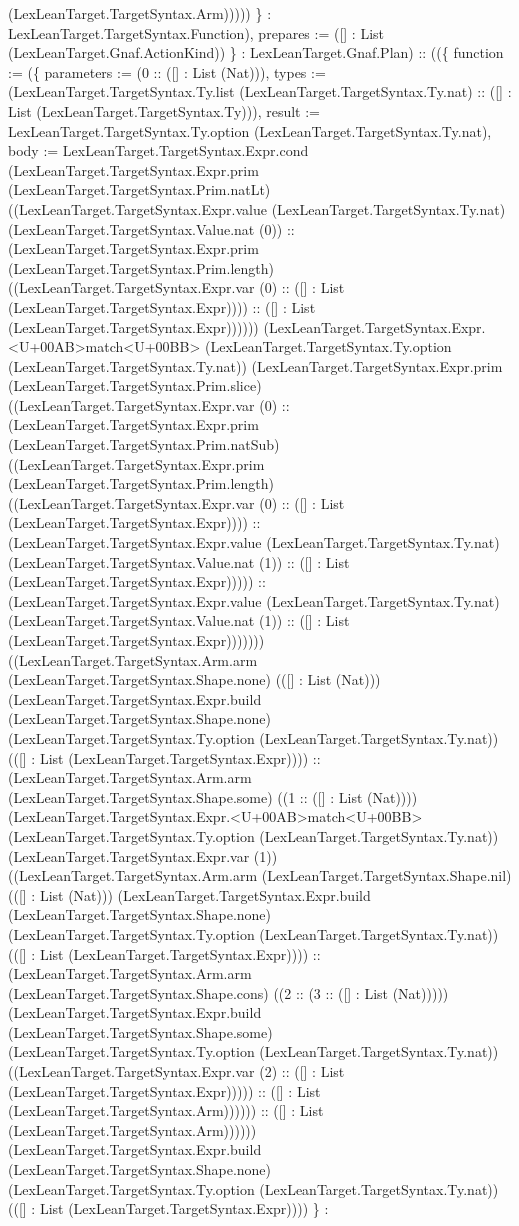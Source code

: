 \documentclass[11pt]{article}
\begin{document}
(LexLeanTarget.TargetSyntax.Arm))))) \} : LexLeanTarget.TargetSyntax.Function), prepares := ([] : List (LexLeanTarget.Gnaf.ActionKind)) \} : LexLeanTarget.Gnaf.Plan) :: ((\{ function := (\{ parameters := (0 :: ([] : List (Nat))), types := (LexLeanTarget.TargetSyntax.Ty.list (LexLeanTarget.TargetSyntax.Ty.nat) :: ([] : List (LexLeanTarget.TargetSyntax.Ty))), result := LexLeanTarget.TargetSyntax.Ty.option (LexLeanTarget.TargetSyntax.Ty.nat), body := LexLeanTarget.TargetSyntax.Expr.cond (LexLeanTarget.TargetSyntax.Expr.prim (LexLeanTarget.TargetSyntax.Prim.natLt) ((LexLeanTarget.TargetSyntax.Expr.value (LexLeanTarget.TargetSyntax.Ty.nat) (LexLeanTarget.TargetSyntax.Value.nat (0)) :: (LexLeanTarget.TargetSyntax.Expr.prim (LexLeanTarget.TargetSyntax.Prim.length) ((LexLeanTarget.TargetSyntax.Expr.var (0) :: ([] : List (LexLeanTarget.TargetSyntax.Expr)))) :: ([] : List (LexLeanTarget.TargetSyntax.Expr)))))) (LexLeanTarget.TargetSyntax.Expr.<U+00AB>match<U+00BB> (LexLeanTarget.TargetSyntax.Ty.option (LexLeanTarget.TargetSyntax.Ty.nat)) (LexLeanTarget.TargetSyntax.Expr.prim (LexLeanTarget.TargetSyntax.Prim.slice) ((LexLeanTarget.TargetSyntax.Expr.var (0) :: (LexLeanTarget.TargetSyntax.Expr.prim (LexLeanTarget.TargetSyntax.Prim.natSub) ((LexLeanTarget.TargetSyntax.Expr.prim (LexLeanTarget.TargetSyntax.Prim.length) ((LexLeanTarget.TargetSyntax.Expr.var (0) :: ([] : List (LexLeanTarget.TargetSyntax.Expr)))) :: (LexLeanTarget.TargetSyntax.Expr.value (LexLeanTarget.TargetSyntax.Ty.nat) (LexLeanTarget.TargetSyntax.Value.nat (1)) :: ([] : List (LexLeanTarget.TargetSyntax.Expr))))) :: (LexLeanTarget.TargetSyntax.Expr.value (LexLeanTarget.TargetSyntax.Ty.nat) (LexLeanTarget.TargetSyntax.Value.nat (1)) :: ([] : List (LexLeanTarget.TargetSyntax.Expr))))))) ((LexLeanTarget.TargetSyntax.Arm.arm (LexLeanTarget.TargetSyntax.Shape.none) (([] : List (Nat))) (LexLeanTarget.TargetSyntax.Expr.build (LexLeanTarget.TargetSyntax.Shape.none) (LexLeanTarget.TargetSyntax.Ty.option (LexLeanTarget.TargetSyntax.Ty.nat)) (([] : List (LexLeanTarget.TargetSyntax.Expr)))) :: (LexLeanTarget.TargetSyntax.Arm.arm (LexLeanTarget.TargetSyntax.Shape.some) ((1 :: ([] : List (Nat)))) (LexLeanTarget.TargetSyntax.Expr.<U+00AB>match<U+00BB> (LexLeanTarget.TargetSyntax.Ty.option (LexLeanTarget.TargetSyntax.Ty.nat)) (LexLeanTarget.TargetSyntax.Expr.var (1)) ((LexLeanTarget.TargetSyntax.Arm.arm (LexLeanTarget.TargetSyntax.Shape.nil) (([] : List (Nat))) (LexLeanTarget.TargetSyntax.Expr.build (LexLeanTarget.TargetSyntax.Shape.none) (LexLeanTarget.TargetSyntax.Ty.option (LexLeanTarget.TargetSyntax.Ty.nat)) (([] : List (LexLeanTarget.TargetSyntax.Expr)))) :: (LexLeanTarget.TargetSyntax.Arm.arm (LexLeanTarget.TargetSyntax.Shape.cons) ((2 :: (3 :: ([] : List (Nat))))) (LexLeanTarget.TargetSyntax.Expr.build (LexLeanTarget.TargetSyntax.Shape.some) (LexLeanTarget.TargetSyntax.Ty.option (LexLeanTarget.TargetSyntax.Ty.nat)) ((LexLeanTarget.TargetSyntax.Expr.var (2) :: ([] : List (LexLeanTarget.TargetSyntax.Expr))))) :: ([] : List (LexLeanTarget.TargetSyntax.Arm)))))) :: ([] : List (LexLeanTarget.TargetSyntax.Arm)))))) (LexLeanTarget.TargetSyntax.Expr.build (LexLeanTarget.TargetSyntax.Shape.none) (LexLeanTarget.TargetSyntax.Ty.option (LexLeanTarget.TargetSyntax.Ty.nat)) (([] : List (LexLeanTarget.TargetSyntax.Expr)))) \} : 
\end{document}
